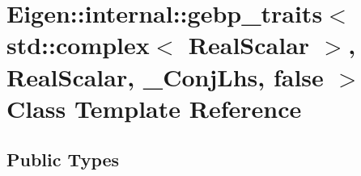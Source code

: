 \hypertarget{class_eigen_1_1internal_1_1gebp__traits_3_01std_1_1complex_3_01_real_scalar_01_4_00_01_real_scald728c008ac4da8a5a1327d1e06be8c1f}{}\section{Eigen\+::internal\+::gebp\+\_\+traits$<$ std\+::complex$<$ Real\+Scalar $>$, Real\+Scalar, \+\_\+\+Conj\+Lhs, false $>$ Class Template Reference}
\label{class_eigen_1_1internal_1_1gebp__traits_3_01std_1_1complex_3_01_real_scalar_01_4_00_01_real_scald728c008ac4da8a5a1327d1e06be8c1f}
\subsection*{Public Types}
